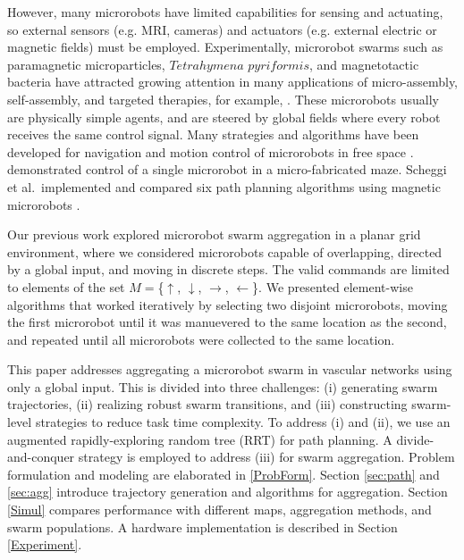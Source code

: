 However, many microrobots have limited capabilities for sensing and actuating, so external sensors (e.g. MRI, cameras) and actuators (e.g. external electric or magnetic fields) must be employed.
Experimentally, microrobot swarms such as paramagnetic microparticles, $Tetrahymena$ $pyriformis$, and magnetotactic bacteria have attracted growing attention in many applications of micro-assembly, self-assembly, and targeted therapies, for example,  \cite{khalil2013microassembly, kim2013swarm, cheang2015self, martel2010using, de2014three}. These microrobots usually are physically simple agents, and are steered by global fields where every robot receives the same control signal.
 Many strategies and algorithms have been developed for navigation and motion control of microrobots in free space \cite{kei2014multiple, wong2016independent, kim2011real}. 
 \cite{khalil2013control} demonstrated control of a single microrobot in a micro-fabricated maze.  
 Scheggi et al.\ implemented and compared six path planning algorithms using magnetic microrobots \cite{scheggi2016experimental}.         


Our previous work explored microrobot swarm aggregation in a planar grid environment\cite{mahadev2016collecting}, where we considered microrobots capable of overlapping, directed by a global input, and moving in discrete steps. The valid commands are limited to elements of the set $M=$\{$\uparrow$, $\downarrow$, $\rightarrow$, $\leftarrow$\}.  We presented element-wise algorithms that worked iteratively by selecting two disjoint microrobots, moving the first microrobot until it was manuevered to the same location as the second, and repeated until all microrobots were collected to the same location.

This paper addresses aggregating a microrobot swarm in vascular networks using only a global input. 
This is divided into three challenges: (i) generating swarm trajectories, (ii) realizing robust swarm transitions, and (iii) constructing swarm-level strategies to reduce task time complexity. 
To address (i) and (ii), we use an augmented rapidly-exploring random tree (RRT) for path planning. 
A divide-and-conquer strategy is employed to address (iii) for swarm aggregation.
 Problem formulation and modeling are elaborated in \ref{ProbForm}. 
  Section \ref{sec:path} and \ref{sec:agg} introduce trajectory generation and algorithms for aggregation. 
  Section \ref{Simul} compares performance with different maps, aggregation methods, and swarm populations.
   A hardware implementation is described in Section \ref{Experiment}.   

  
  
  